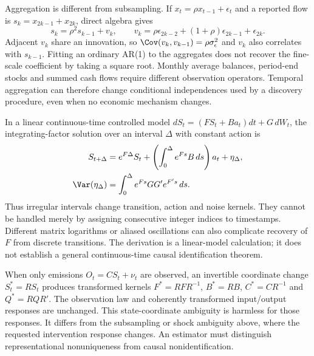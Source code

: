 Aggregation is different from subsampling. If
$x_t=\rho x_{t-1}+\epsilon_t$ and a reported flow is
$s_k=x_{2k-1}+x_{2k}$, direct algebra gives
\begin{equation}
 s_k=\rho^2s_{k-1}+v_k,\qquad
 v_k=\rho\epsilon_{2k-2}+(1+\rho)\epsilon_{2k-1}+\epsilon_{2k}.
 \label{r3:aggregate}
\end{equation}
Adjacent $v_k$ share an innovation, so
$\Cov(v_k,v_{k-1})=\rho\sigma_\epsilon^2$ and
$v_k$ also correlates with $s_{k-1}$. Fitting an ordinary AR(1)
to the aggregates does not recover the fine-scale coefficient by
taking a square root. Monthly average balances, period-end stocks
and summed cash flows require different observation operators.
Temporal aggregation can therefore change conditional independences
used by a discovery procedure, even when no economic mechanism changes.

In a linear continuous-time controlled model
$dS_t=(FS_t+Ba_t)dt+G\,dW_t$, the integrating-factor solution over
an interval $\Delta$ with constant action is
\begin{align}
 S_{t+\Delta}&=e^{F\Delta}S_t+
 \left(\int_0^\Delta e^{Fs}B\,ds\right)a_t+\eta_\Delta,\nonumber\\
 \Var(\eta_\Delta)&=\int_0^\Delta e^{Fs}GG'e^{F's}\,ds.
 \label{r3:continuous-discrete}
\end{align}
Thus irregular intervals change transition, action and noise kernels.
They cannot be handled merely by assigning consecutive integer
indices to timestamps. Different matrix logarithms or aliased
oscillations can also complicate recovery of $F$ from discrete
transitions. The derivation is a linear-model calculation; it does
not establish a general continuous-time causal identification theorem.

When only emissions $O_t=CS_t+\nu_t$ are observed, an invertible
coordinate change $S_t^*=RS_t$ produces transformed kernels
$F^*=RFR^{-1}$, $B^*=RB$, $C^*=CR^{-1}$ and $Q^*=RQR'$.
The observation law and coherently transformed input/output responses
are unchanged. This state-coordinate ambiguity is harmless for those
responses. It differs from the subsampling or shock ambiguity above,
where the requested intervention response changes. An estimator must
distinguish representational nonuniqueness from causal nonidentification.

